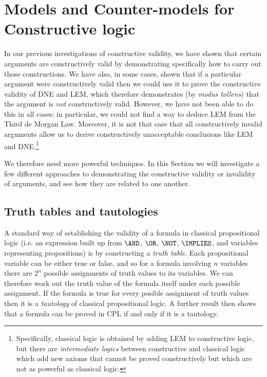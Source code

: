 \section{Models and Counter-models for Constructive logic}


In our previous investigations of constructive validity, we have shown that certain arguments are constructively valid by demonstrating specifically how to carry out those constructions.  We have also, in some cases, shown that 
if a particular argument were constructively valid then
we could use it to prove the constructive validity of DNE and LEM, which therefore demonstrates (by \emph{modus tollens}) that the argument is \emph{not} constructively valid.
However, we have not been able to do this in all cases: in particular, we could not find a way to deduce LEM from the Third de Morgan Law.  Moreover, it is not that case that all constructively invalid arguments allow us to derive constructively unacceptable conclusions like LEM and DNE.\footnote{
Specifically, classical logic is obtained by adding LEM to constructive logic, but there are \emph{intermediate logics} between constructive and classical logic which add new axioms that cannot be proved constructively but which are not as powerful as classical logic. 
}

We therefore need more powerful techniques.  In this Section we will investigate a few different approaches to demonstrating the constructive validity or invalidity of arguments, and see how they are related to one another.

\subsection{Truth tables and tautologies}
\label{sec:Models-TruthTables}

A standard way of establishing the validity of a formula in classical propositional logic (i.e. an expression built up from $\AND$, $\OR$, $\NOT$, $\IMPLIES$, and variables representing propositions)
is by constructing a \emph{truth table}.  Each propositional variable can be either true or false, and so for a formula involving $n$ variables there are $2^n$ possible assignments of truth values to its variables.  We can therefore work out the truth value of the formula itself under each possible assignment.  If the formula is true for every posible assignment of truth values then it is a \emph{tautology} of classical propositional logic.  A further result then shows that a formula can be proved in CPL if and only if it is a tautology.

